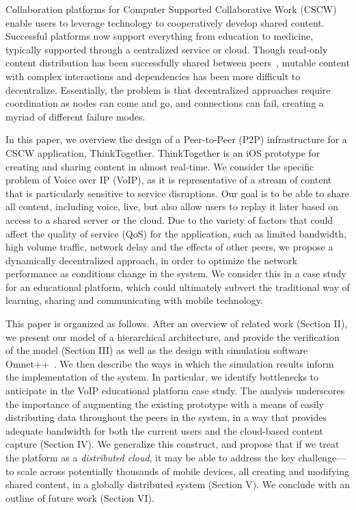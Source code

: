 Collaboration platforms for Computer Supported Collaborative Work (CSCW) enable 
users to leverage technology to cooperatively develop shared content.   
Successful platforms now support everything from education to medicine, 
typically supported through a centralized service or cloud. Though read-only 
content distribution has been successfully shared between 
peers~\cite{XG_P2P_INFO04}, mutable content with complex interactions and 
dependencies 
has been more difficult to decentralize. Essentially, the problem is that 
decentralized approaches require coordination as nodes can come and go, and 
connections can fail, creating a myriad of different failure modes.

In this paper, we overview the design of a Peer-to-Peer (P2P) infrastructure for 
a CSCW application, ThinkTogether.  ThinkTogether is an iOS prototype for 
creating and sharing content in almost real-time. We consider the specific 
problem of Voice over IP (VoIP), as it is representative of a stream of content 
that is particularly sensitive to service disruptions.  Our goal is to be able 
to share all content, including voice, live, but also allow users to replay it 
later based on access to a shared server or the cloud.   Due to the variety of 
factors that could affect the quality of service (QoS) for the application, such 
as limited bandwidth, high volume traffic, network delay and the effects of 
other peers, we propose a dynamically decentralized approach, in order to 
optimize the network performance as conditions change in the system.  We 
consider this 
in a case study for an educational platform, which could ultimately subvert the 
traditional way of learning, sharing and communicating with mobile technology.
 

This paper is organized as follows.  After an overview of related work (Section 
II), we present our model of a hierarchical architecture, and provide the 
verification of the model (Section III) as well as the design with simulation 
software Omnet++~\cite{A_OMNET_ESM01}. We then describe the ways in which 
the simulation results inform the implementation of the system.  
In particular, we identify bottlenecks to anticipate in the VoIP educational 
platform case study. The analysis underscores the importance of augmenting the 
existing prototype with a means of easily distributing data throughout the peers 
in the system, in a way that provides adequate bandwidth for both the current 
users and the cloud-based content capture (Section IV).  We generalize this 
construct, and propose that if we treat the platform as a {\em distributed 
cloud}, it may be able to address the key challenge---to scale across 
potentially thousands of mobile devices, all creating and modifying shared 
content, in a globally distributed system (Section V).  We conclude with an 
outline of future work (Section VI).

